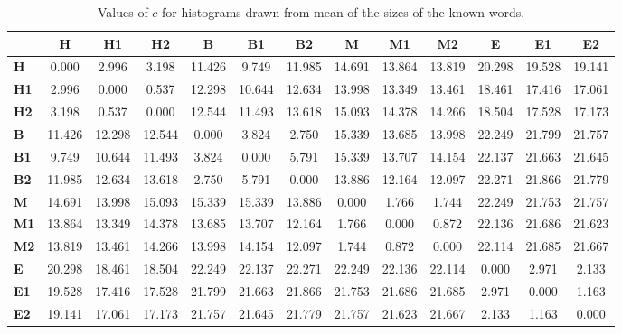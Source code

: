 \begin{table*}[h!]
\begin{center}
\begin{tabular}{| l || c | c | c || c | c | c || c | c | c || c | c | c |}\hline
 & {\bf H} & {\bf H1} & {\bf H2} & {\bf B} & {\bf B1} & {\bf B2} & {\bf M} & {\bf M1} & {\bf M2} & {\bf E} & {\bf E1} & {\bf E2} \\\hline\hline
{\bf H} & 0.000 & 2.996 & 3.198 & 11.426 & 9.749 & 11.985 & 14.691 & 13.864 & 13.819 & 20.298 & 19.528 & 19.141 \\\hline
{\bf H1} & 2.996 & 0.000 & 0.537 & 12.298 & 10.644 & 12.634 & 13.998 & 13.349 & 13.461 & 18.461 & 17.416 & 17.061 \\\hline
{\bf H2} & 3.198 & 0.537 & 0.000 & 12.544 & 11.493 & 13.618 & 15.093 & 14.378 & 14.266 & 18.504 & 17.528 & 17.173 \\\hline\hline
{\bf B} & 11.426 & 12.298 & 12.544 & 0.000 & 3.824 & 2.750 & 15.339 & 13.685 & 13.998 & 22.249 & 21.799 & 21.757 \\\hline
{\bf B1} & 9.749 & 10.644 & 11.493 & 3.824 & 0.000 & 5.791 & 15.339 & 13.707 & 14.154 & 22.137 & 21.663 & 21.645 \\\hline
{\bf B2} & 11.985 & 12.634 & 13.618 & 2.750 & 5.791 & 0.000 & 13.886 & 12.164 & 12.097 & 22.271 & 21.866 & 21.779 \\\hline\hline
{\bf M} & 14.691 & 13.998 & 15.093 & 15.339 & 15.339 & 13.886 & 0.000 & 1.766 & 1.744 & 22.249 & 21.753 & 21.757 \\\hline
{\bf M1} & 13.864 & 13.349 & 14.378 & 13.685 & 13.707 & 12.164 & 1.766 & 0.000 & 0.872 & 22.136 & 21.686 & 21.623 \\\hline
{\bf M2} & 13.819 & 13.461 & 14.266 & 13.998 & 14.154 & 12.097 & 1.744 & 0.872 & 0.000 & 22.114 & 21.685 & 21.667 \\\hline\hline
{\bf E} & 20.298 & 18.461 & 18.504 & 22.249 & 22.137 & 22.271 & 22.249 & 22.136 & 22.114 & 0.000 & 2.971 & 2.133 \\\hline
{\bf E1} & 19.528 & 17.416 & 17.528 & 21.799 & 21.663 & 21.866 & 21.753 & 21.686 & 21.685 & 2.971 & 0.000 & 1.163 \\\hline
{\bf E2} & 19.141 & 17.061 & 17.173 & 21.757 & 21.645 & 21.779 & 21.757 & 21.623 & 21.667 & 2.133 & 1.163 & 0.000 \\\hline
\end{tabular}
\caption{Values of $c$ for histograms drawn from mean of the sizes of the known words.}
\end{center}
\end{table*}